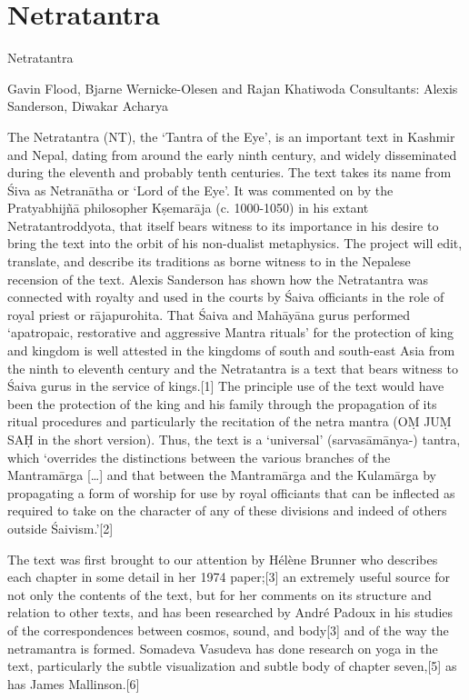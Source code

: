 \section{Netratantra}

Netratantra

Gavin Flood, Bjarne Wernicke-Olesen and Rajan Khatiwoda
Consultants: Alexis Sanderson, Diwakar Acharya

The Netratantra (NT), the ‘Tantra of the Eye’, is an important text in Kashmir and Nepal, dating from around the early ninth century, and widely disseminated during the eleventh and probably tenth centuries. The text takes its name from Śiva as Netranātha or ‘Lord of the Eye’. It was commented on by the Pratyabhijñā philosopher Kṣemarāja (c. 1000-1050) in his extant Netratantroddyota, that itself bears witness to its importance in his desire to bring the text into the orbit of his non-dualist metaphysics. The project will edit, translate, and describe its traditions as borne witness to in the Nepalese recension of the text. Alexis Sanderson has shown how the Netratantra was connected with royalty and used in the courts by Śaiva officiants in the role of royal priest or rājapurohita. That Śaiva and Mahāyāna gurus performed ‘apatropaic, restorative and aggressive Mantra rituals’ for the protection of king and kingdom is well attested in the kingdoms of south and south-east Asia from the ninth to eleventh century and the Netratantra is a text that bears witness to Śaiva gurus in the service of kings.[1] The principle use of the text would have been the protection of the king and his family through the propagation of its ritual procedures and particularly the recitation of the netra mantra (OṂ JUṂ SAḤ in the short version). Thus, the text is a ‘universal’ (sarvasāmānya-) tantra, which ‘overrides the distinctions between the various branches of the Mantramārga […] and that between the Mantramārga and the Kulamārga by propagating a form of worship for use by royal officiants that can be inflected as required to take on the character of any of these divisions and indeed of others outside Śaivism.’[2]

The text was first brought to our attention by Hélène Brunner who describes each chapter in some detail in her 1974 paper;[3] an extremely useful source for not only the contents of the text, but for her comments on its structure and relation to other texts, and has been researched by André Padoux in his studies of the correspondences between cosmos, sound, and body[3] and of the way the netramantra is formed. Somadeva Vasudeva has done research on yoga in the text, particularly the subtle visualization and subtle body of chapter seven,[5] as has James Mallinson.[6]

